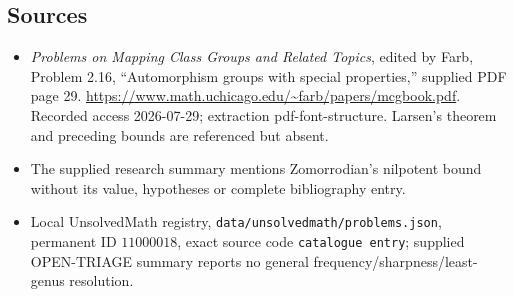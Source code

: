 \documentclass[11pt]{article}
\begin{document}
\subsection{Sources}
\begin{itemize}
\item \emph{Problems on Mapping Class Groups and Related Topics}, edited by Farb, Problem 2.16, ``Automorphism groups with special properties,'' supplied PDF page 29. \url{https://www.math.uchicago.edu/~farb/papers/mcgbook.pdf}. Recorded access 2026-07-29; extraction pdf-font-structure. Larsen's theorem and preceding bounds are referenced but absent.
\item The supplied research summary mentions Zomorrodian's nilpotent bound without its value, hypotheses or complete bibliography entry.
\item Local UnsolvedMath registry, \texttt{data/unsolvedmath/problems.json}, permanent ID \(11000018\), exact source code \texttt{catalogue entry}; supplied OPEN-TRIAGE summary reports no general frequency/sharpness/least-genus resolution.
\end{itemize}
\end{document}

